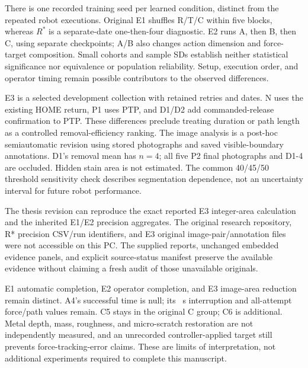 There is one recorded training seed per learned condition, distinct from the repeated robot executions. Original E1 shuffles R/T/C within five blocks, whereas \(R^{*}\) is a separate-date one-then-four diagnostic. E2 runs A, then B, then C, using separate checkpoints; A/B also changes action dimension and force-target composition. Small cohorts and sample SDs establish neither statistical significance nor equivalence or population reliability. Setup, execution order, and operator timing remain possible contributors to the observed differences.

E3 is a selected development collection with retained retries and dates. N uses the existing HOME return, P1 uses PTP, and D1/D2 add commanded-release confirmation to PTP. These differences preclude treating duration or path length as a controlled removal-efficiency ranking. The image analysis is a post-hoc semiautomatic revision using stored photographs and saved visible-boundary annotations. D1's removal mean has \(n=4\); all five P2 final photographs and D1-4 are occluded. Hidden stain area is not estimated. The common 40/45/50 threshold sensitivity check describes segmentation dependence, not an uncertainty interval for future robot performance.

The thesis revision can reproduce the exact reported E3 integer-area calculation and the inherited E1/E2 precision aggregates. The original research repository, R* precision CSV/run identifiers, and E3 original image-pair/annotation files were not accessible on this PC. The supplied reports, unchanged embedded evidence panels, and explicit source-status manifest preserve the available evidence without claiming a fresh audit of those unavailable originals.

E1 automatic completion, E2 operator completion, and E3 image-area reduction remain distinct. A4's successful time is null; its \AfourInterval~s interruption and all-attempt force/path values remain. C5 stays in the original C group; C6 is additional. Metal depth, mass, roughness, and micro-scratch restoration are not independently measured, and an unrecorded controller-applied target still prevents force-tracking-error claims. These are limits of interpretation, not additional experiments required to complete this manuscript.
